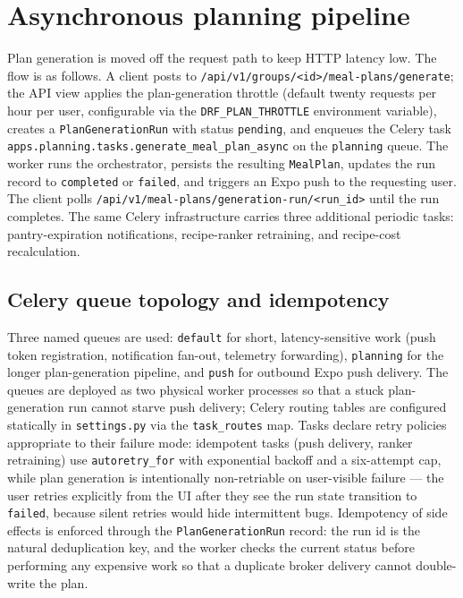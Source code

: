 \section{Asynchronous planning pipeline}
\label{sec:async-pipeline}

Plan generation is moved off the request path to keep HTTP latency low. The flow is as follows. A client posts to \texttt{/api/v1/groups/<id>/meal-plans/generate}; the API view applies the plan-generation throttle (default twenty requests per hour per user, configurable via the \texttt{DRF\_PLAN\_THROTTLE} environment variable), creates a \texttt{PlanGenerationRun} with status \texttt{pending}, and enqueues the Celery task \texttt{apps.planning.tasks.generate\_meal\_plan\_async} on the \texttt{planning} queue. The worker runs the orchestrator, persists the resulting \texttt{MealPlan}, updates the run record to \texttt{completed} or \texttt{failed}, and triggers an Expo push to the requesting user. The client polls \texttt{/api/v1/meal-plans/generation-run/<run\_id>} until the run completes. The same Celery infrastructure carries three additional periodic tasks: pantry-expiration notifications, recipe-ranker retraining, and recipe-cost recalculation.

\subsection{Celery queue topology and idempotency}

Three named queues are used: \texttt{default} for short, latency-sensitive work (push token registration, notification fan-out, telemetry forwarding), \texttt{planning} for the longer plan-generation pipeline, and \texttt{push} for outbound Expo push delivery. The queues are deployed as two physical worker processes so that a stuck plan-generation run cannot starve push delivery; Celery routing tables are configured statically in \texttt{settings.py} via the \texttt{task\_routes} map. Tasks declare retry policies appropriate to their failure mode: idempotent tasks (push delivery, ranker retraining) use \texttt{autoretry\_for} with exponential backoff and a six-attempt cap, while plan generation is intentionally non-retriable on user-visible failure --- the user retries explicitly from the UI after they see the run state transition to \texttt{failed}, because silent retries would hide intermittent bugs. Idempotency of side effects is enforced through the \texttt{PlanGenerationRun} record: the run id is the natural deduplication key, and the worker checks the current status before performing any expensive work so that a duplicate broker delivery cannot double-write the plan.

